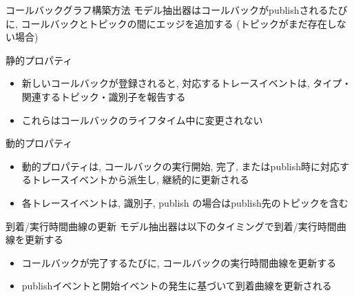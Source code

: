 \begin{frame}{コールバックグラフ構築方法}
    モデル抽出器はコールバックがpublishされるたびに, コールバックとトピックの間にエッジを追加する (トピックがまだ存在しない場合)
    \begin{block}{静的プロパティ}
        \setlength{\linewidth}{0.98\columnwidth}
        \begin{itemize}
            \footnotesize
            \item 新しいコールバックが登録されると, 対応するトレースイベントは, タイプ・関連するトピック・識別子を報告する
            \item これらはコールバックのライフタイム中に変更されない
        \end{itemize}
    \end{block}
    \begin{block}{動的プロパティ}
        \setlength{\linewidth}{0.98\columnwidth}
        \begin{itemize}
            \footnotesize
            \item 動的プロパティは, コールバックの実行開始, 完了, またはpublish時に対応するトレースイベントから派生し, 継続的に更新される
            \item 各トレースイベントは, 識別子, publish の場合はpublish先のトピックを含む
        \end{itemize}
    \end{block}
\end{frame}

\begin{frame}{到着/実行時間曲線の更新}
    モデル抽出器は以下のタイミングで到着/実行時間曲線を更新する
    \begin{itemize}
        \item コールバックが完了するたびに, コールバックの実行時間曲線を更新する
        \item publishイベントと開始イベントの発生に基づいて到着曲線を更新される
    \end{itemize}
\end{frame}


